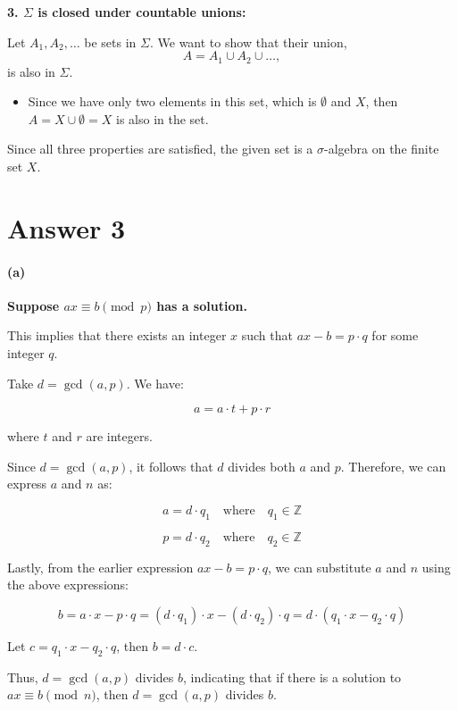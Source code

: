 \documentclass[12pt]{article}
\begin{document}
\par \hspace*{1em}\textbf{3. $\Sigma$ is closed under countable unions:}

Let $A_1, A_2, \ldots$ be sets in $\Sigma$. We want to show that their union,
\[
A = A_1 \cup A_2 \cup \ldots,
\]
is also in $\Sigma$.
\begin{itemize}
    \item Since we have only two elements in this set, which is $\emptyset$ and $X$, then $A = X \cup \emptyset = X$ is also in the set.    
\end{itemize}
Since all three properties are satisfied, the given set is a $\sigma$-algebra on the finite set $X$.


\section*{Answer 3}

\paragraph{(a)}
\textbf{Suppose $ax \equiv b \pmod{p}$ has a solution.}

This implies that there exists an integer $x$ such that $ax - b = p \cdot q$ for some integer $q$.

Take $d = \gcd(a, p)$. We have:

\[
a = a \cdot t + p \cdot r
\]

where $t$ and $r$ are integers.

Since $d = \gcd(a, p)$, it follows that $d$ divides both $a$ and $p$. Therefore, we can express $a$ and $n$ as:

\[
a = d \cdot q_1 \quad \text{where} \quad q_1 \in \mathbb{Z}
\]

\[
p = d \cdot q_2 \quad \text{where} \quad q_2 \in \mathbb{Z}
\]

Lastly, from the earlier expression $ax - b = p \cdot q$, we can substitute $a$ and $n$ using the above expressions:

\[
b = a \cdot x - p \cdot q = (d \cdot q_1) \cdot x - (d \cdot q_2) \cdot q = d \cdot (q_1 \cdot x - q_2 \cdot q)
\]

Let $c = q_1 \cdot x - q_2 \cdot q$, then $b = d \cdot c$.

Thus, $d = \gcd(a, p)$ divides $b$, indicating that if there is a solution to $ax \equiv b \pmod{n}$, then $d = \gcd(a, p)$ divides $b$. \\
\end{document}
